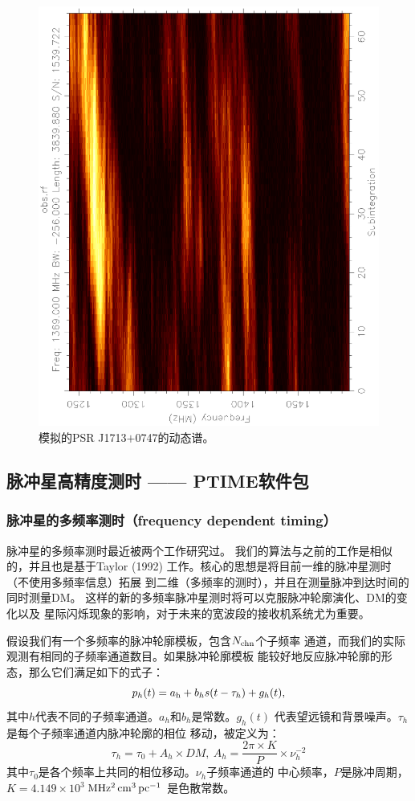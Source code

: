 \begin{figure}
\begin{center}
\includegraphics[width=3.5 in,angle=-90]{obsDyn.ps}
\end{center}
\caption{模拟的PSR J1713$+$0747的动态谱。}
\label{obs2}
\end{figure}

\subsection{脉冲星高精度测时 —— PTIME软件包}

\subsubsection{脉冲星的多频率测时（frequency dependent timing）}

脉冲星的多频率测时最近被两个工作研究过\supercite{Pennucci14,Liu14}。
我们的算法与之前的工作是相似的，并且也是基于Taylor (1992)\supercite{Taylor92}
工作。核心的思想是将目前一维的脉冲星测时（不使用多频率信息）拓展
到二维（多频率的测时），并且在测量脉冲到达时间的同时测量DM。
这样的新的多频率脉冲星测时将可以克服脉冲轮廓演化、DM的变化以及
星际闪烁现象的影响，对于未来的宽波段的接收机系统尤为重要。

假设我们有一个多频率的脉冲轮廓模板，包含$N_{\rm{chn}}$个子频率
通道，而我们的实际观测有相同的子频率通道数目。如果脉冲轮廓模板
能较好地反应脉冲轮廓的形态，那么它们满足如下的式子：
%
\begin{equation}
p_{h}(t)=a_{\rm{h}}+b_{h}s(t-\tau_{h})+g_{h}(t),
\end{equation}
%
其中$h$代表不同的子频率通道。$a_{h}$和$b_{h}$是常数。$g_{h}(t)$
代表望远镜和背景噪声。$\tau_{h}$是每个子频率通道内脉冲轮廓的相位
移动，被定义为：
%
\begin{equation}
\tau_{h}=\tau_{0}+A_{h}\times DM,\ A_{h}=\frac{2\pi\times K}{P}\times\nu_{h}^{-2}
\end{equation}
%
其中$\tau_{0}$是各个频率上共同的相位移动。$\nu_{h}$子频率通道的
中心频率，$P$是脉冲周期，$K=4.149\times 10^{3}$\,$\rm{MHz^{2}\,cm^{3}\,pc^{-1}}$ 
是色散常数。

